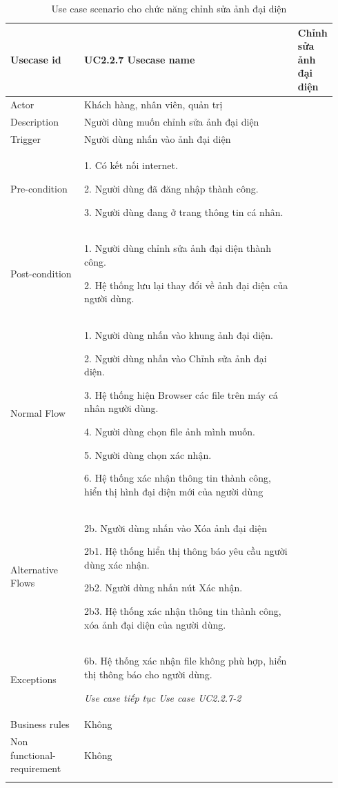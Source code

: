 \begin{longtable}{|>{\hspace{0pt}}m{0.235\linewidth}|>{\hspace{0pt}}m{0.708\linewidth}|} 
\hline
Usecase id & UC2.2.7 \endfirsthead 
\hline
Usecase name & Chỉnh sửa ảnh đại diện \\ 
\hline
Actor & Khách hàng, nhân viên, quản trị \\ 
\hline
Description & Người dùng muốn chỉnh sửa ảnh đại diện \\ 
\hline
Trigger & Người dùng nhấn vào ảnh đại diện \\ 
\hline
Pre-condition & 1. Có kết nối internet.\par{}2. Người dùng đã đăng nhập thành công.\par{}3. Người dùng đang ở trang thông tin cá nhân. \\ 
\hline
Post-condition & 1. Người dùng chỉnh sửa ảnh đại diện thành công. \par{}2. Hệ thống lưu lại thay đổi về ảnh đại diện của người dùng. \\ 
\hline
Normal Flow & 1. Người dùng nhấn vào khung ảnh đại diện.\par{}2. Người dùng nhấn vào Chỉnh sửa ảnh đại diện. \par{}3. Hệ thống hiện Browser các file trên máy cá nhân người dùng. \par{}4. Người dùng chọn file ảnh mình muốn. \par{}5. Người dùng chọn xác nhận. \par{}6. Hệ thống xác nhận thông tin thành công, hiển thị hình đại diện mới của người dùng \\ 
\hline
Alternative Flows & 2b. Người dùng nhấn vào Xóa ảnh đại diện\par{}2b1. Hệ thống hiển thị thông báo yêu cầu người dùng xác nhận.\par{}2b2. Người dùng nhấn nút Xác nhận.\par{}2b3. Hệ thống xác nhận thông tin thành công, xóa ảnh đại diện của người dùng.~ \\ 
\hline
Exceptions & 6b. Hệ thống xác nhận file không phù hợp, hiển thị thông báo cho người dùng.\par{}\textit{Use case tiếp tục Use case UC2.2.7-2} \\ 
\hline
Business rules & Không \\ 
\hline
Non functional-requirement & Không \\ 
\hline
\caption{Use case scenario cho chức năng chỉnh sửa ảnh đại diện}
\end{longtable}

